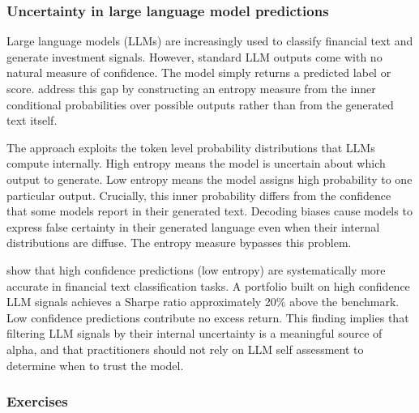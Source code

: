 \subsubsection{Uncertainty in large language model predictions}\label{sec_llm_unc}

Large language models (LLMs) are increasingly used to classify financial text and generate investment signals. However, standard LLM outputs come with no natural measure of confidence. The model simply returns a predicted label or score. \cite{chen2026llm} address this gap by constructing an entropy measure from the inner conditional probabilities over possible outputs rather than from the generated text itself.

The approach exploits the token level probability distributions that LLMs compute internally. High entropy means the model is uncertain about which output to generate. Low entropy means the model assigns high probability to one particular output. Crucially, this inner probability differs from the confidence that some models report in their generated text. Decoding biases cause models to express false certainty in their generated language even when their internal distributions are diffuse. The entropy measure bypasses this problem.

\cite{chen2026llm} show that high confidence predictions (low entropy) are systematically more accurate in financial text classification tasks. A portfolio built on high confidence LLM signals achieves a Sharpe ratio approximately 20\% above the benchmark. Low confidence predictions contribute no excess return. This finding implies that filtering LLM signals by their internal uncertainty is a meaningful source of alpha, and that practitioners should not rely on LLM self assessment to determine when to trust the model.

\subsubsection{Exercises}

